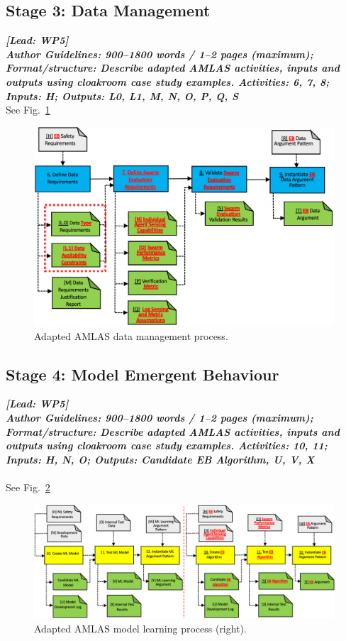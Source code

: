 \documentclass[lettersize,journal]{IEEEtran}
\begin{document}
\subsection{Stage 3: Data Management} \label{framework-stage3}
\noindent \textbf{\textit{[Lead:  WP5]}}\\ 
\noindent\textbf{\textit{Author Guidelines: 900–1800 words / 1–2 pages (maximum); \\Format/structure: Describe adapted AMLAS activities, inputs and outputs using cloakroom case study examples. Activities: 6, 7, 8; Inputs: H; Outputs: L0, L1, M, N, O, P, Q, S}}\\
See Fig.~\ref{amlas-a-stage3}
\begin{figure}
	\centering
	\includegraphics[width=1.0\textwidth]{figures/amlas-a-stage3.png}
	\caption{Adapted AMLAS data management process.}
	\label{amlas-a-stage3}
\end{figure}

\subsection{Stage 4: Model Emergent Behaviour} \label{framework-stage4}
\noindent \textbf{\textit{[Lead:  WP5]}}\\ 
\noindent\textbf{\textit{Author Guidelines: 900–1800 words / 1–2 pages (maximum); \\Format/structure: Describe adapted AMLAS activities, inputs and outputs using cloakroom case study examples. Activities: 10, 11; Inputs: H, N, O; Outputs: Candidate EB Algorithm, U, V, X}}\\\\
See Fig.~\ref{amlas-a-stage4}
\begin{figure}
	\centering
	\includegraphics[width=1.0\textwidth]{figures/amlas-a-stage4.png}
	\caption{Adapted AMLAS model learning process (right).}
	\label{amlas-a-stage4}
\end{figure}
\end{document}
